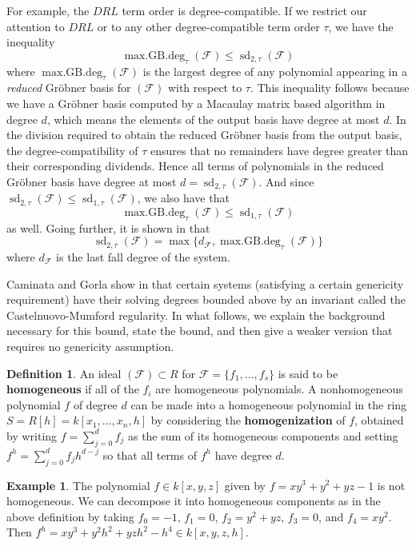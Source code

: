 \documentclass[11pt]{article}
\newcommand{\F}{\mathcal{F}}
\DeclareMathOperator{\sd}{sd}
\DeclareMathOperator{\mdeg}{max.GB.deg}
\theoremstyle{definition}
\newtheorem{definition}{Definition}
\newtheorem{example}{Example}
\begin{document}
For example, the $DRL$ term order is degree-compatible. If we restrict our attention to $DRL$ or to any other degree-compatible term order $\tau$, we have the inequality \[\mdeg_\tau(\mathcal{F}) \leq \sd_{2,\tau}(\mathcal{F})\] where $\mdeg_\tau(\F)$ is the largest degree of any polynomial appearing in a \emph{reduced} Gröbner basis for $(\F)$ with respect to $\tau$. This inequality follows because we have a Gröbner basis computed by a Macaulay matrix based algorithm in degree $d$, which means the elements of the output basis have degree at most $d$. In the division required to obtain the reduced Gröbner basis from the output basis, the degree-compatibility of $\tau$ ensures that no remainders have degree greater than their corresponding dividends. Hence all terms of polynomials in the reduced Gröbner basis have degree at most $d = \sd_{2,\tau}(\mathcal{F})$. And since $\sd_{2,\tau}(\F) \leq \sd_{1,\tau}(\F)$, we also have that \[ \mdeg_\tau(\F) \leq \sd_{1,\tau}(\F) \] as well. Going further, it is shown in \cite{caminata2023solving} that \[ \sd_{2,\tau}(\F) = \max\{d_\F, \mdeg_\tau(\F)\} \] where $d_\F$ is the last fall degree of the system. 

Caminata and Gorla show in \cite{caminata2020solving} that certain systems (satisfying a certain genericity requirement) have their solving degrees bounded above by an invariant called the Castelnuovo-Mumford regularity. In what follows, we explain the background necessary for this bound, state the bound, and then give a weaker version that requires no genericity assumption. 


\begin{definition}
	An ideal $(\F) \subset R$ for $\F = \{f_1, \dots, f_s\}$ is said to be \textbf{homogeneous} if all of the $f_i$ are homogeneous polynomials. A nonhomogeneous polynomial $f$ of degree $d$ can be made into a homogeneous polynomial in the ring $S = R[h] = k[x_1, \dots, x_n, h]$ by considering the \textbf{homogenization} of $f$, obtained by writing $f = \sum_{j=0}^d f_j$ as the sum of its homogeneous components and setting $f^h = \sum_{j = 0}^d f_j h^{d - j}$ so that all terms of $f^h$ have degree $d$. 
\end{definition}


\begin{example}
	The polynomial $f \in k[x, y, z]$ given by $f = xy^3 + y^2 + yz - 1$ is not homogeneous. We can decompose it into homogeneous components as in the above definition by taking $f_0 = -1$, $f_1 = 0$, $f_2 = y^2 + yz$, $f_3 = 0$, and $f_4 = xy^2$. Then $f^h = xy^3 + y^2h^2 + yzh^2 - h^4 \in k[x,y,z,h]$. 
\end{example}
\end{document}
